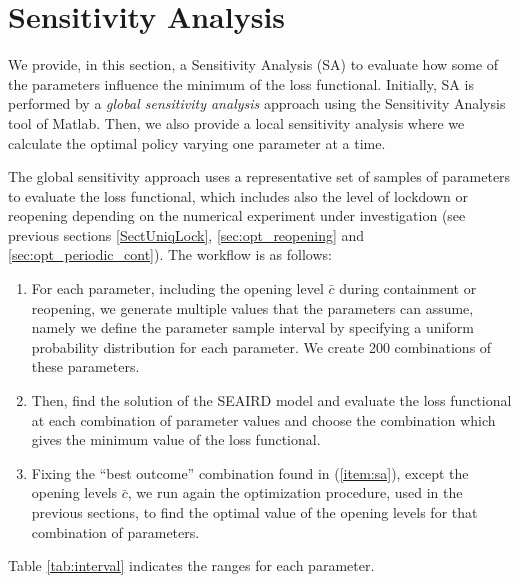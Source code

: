 \documentclass{amsart}
\begin{document}
\vskip 5cm
\newpage

\section{Sensitivity Analysis}
We provide, in this section, a Sensitivity Analysis (SA) to evaluate how some of the parameters influence the minimum of the loss functional. Initially, SA is performed by a \textit{global sensitivity analysis} approach using the Sensitivity Analysis tool of Matlab. Then, we also provide a local sensitivity analysis where we calculate the optimal policy varying one parameter at a time. 

The global sensitivity approach uses a representative set of samples of parameters to evaluate the loss functional, which includes also the level of lockdown or reopening  depending on the numerical experiment under investigation (see previous sections \ref{SectUniqLock}, \ref{sec:opt_reopening} and \ref{sec:opt_periodic_cont}). The workflow is as follows:
\begin{enumerate}
    \item For each parameter, including the opening level
    $\bar{c}$ during
    containment or reopening, we generate multiple values that the parameters can assume, namely we define the parameter sample interval by specifying a uniform probability distribution for each parameter. We create 200 combinations of these parameters.  
    \item\label{item:sa} Then, find the solution of the SEAIRD model and evaluate the loss functional at each combination of parameter values and choose the combination which gives the minimum value of the loss functional.
    \item\label{item:sa_plus_opt} Fixing the ``best outcome'' combination found in (\ref{item:sa}), except the opening levels $\bar{c}$, we run again the optimization procedure, used in the previous sections, to find the optimal value of the opening levels for that combination of parameters.       
\end{enumerate}
 Table \ref{tab:interval} indicates the ranges
 for each parameter.	
\end{document}
